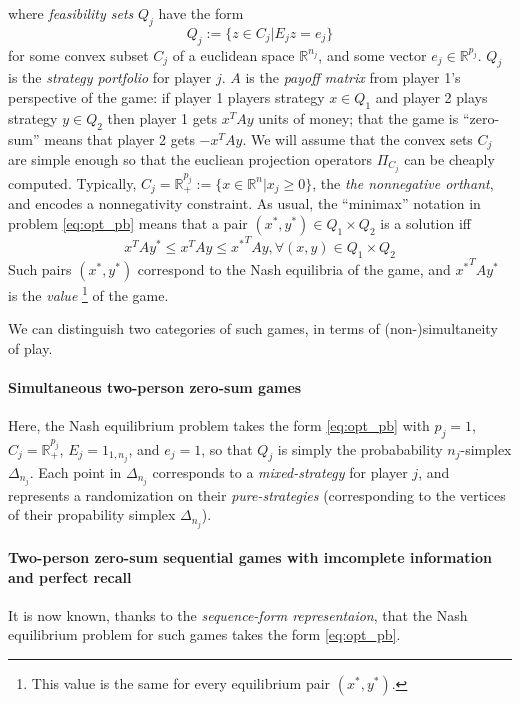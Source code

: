 \documentclass{article} %
\begin{document}
where \textit{feasibility sets} $Q_j$ have the form
\begin{equation}
  Q_j := \{z \in C_j|E_jz = e_j\}
\end{equation}
for some convex subset $C_j$ of a euclidean space $\mathbb{R}^{n_j}$, and some vector $e_j \in \mathbb{R}^{p_j}$.
$Q_j$ is the \textit{strategy portfolio} for player $j$. $A$ is the \textit{payoff matrix} from player 1's perspective of the game: if player 1 players strategy
$x \in Q_1$ and player 2 plays strategy $y \in Q_2$ then player 1 gets $x^TAy$ units of money; that the game is ``zero-sum'' means that player 2 gets $-x^TAy$.
We will assume that the convex sets $C_j$ are simple enough so that the eucliean projection operators $\Pi_{C_j}$ can be cheaply computed.
Typically, $C_j = \mathbb{R}^{p_j}_+ := \{x \in \mathbb{R}^n|x_j \ge 0\}$, the \textit{the nonnegative orthant}, and encodes a nonnegativity constraint. %
As usual, the ``minimax'' notation in problem \eqref{eq:opt_pb} means that a pair $(x^*, y^*) \in Q_1 \times Q_2$ is a solution iff
\begin{equation}
  x^TAy^* \le x^TAy \le {x^*}^TAy, \forall (x, y) \in Q_1 \times Q_2
\end{equation}
Such pairs $(x^*, y^*)$ correspond to the Nash equilibria of the game, and ${x^*}^TAy^*$ is the \textit{value}
\footnote{This value is the same for every equilibrium pair $(x^*, y^*)$.} of the game.

We can distinguish two categories of such games, in terms of (non-)simultaneity of play.
\paragraph{Simultaneous two-person zero-sum games}
\label{subsec:example_games}
Here, the Nash equilibrium problem takes the form \eqref{eq:opt_pb} with $p_j = 1$, $C_j = \mathbb{R}^{p_j}_+$, $E_j = 1_{1, n_j}$,
  and $e_j = 1$, so that $Q_j$ is simply the probabability $n_j$-simplex $\Delta_{n_j}$. Each point in $\Delta_{n_j}$ corresponds to a \textit{mixed-strategy} for player $j$,
and represents a randomization on their \textit{pure-strategies} (corresponding to the vertices of their propability simplex $\Delta_{n_j}$).

\paragraph{Two-person zero-sum sequential games with imcomplete information and perfect recall}
It is now known, thanks to the \textit{sequence-form representaion}, that the Nash equilibrium problem for such games takes the form \eqref{eq:opt_pb}.
\end{document}
